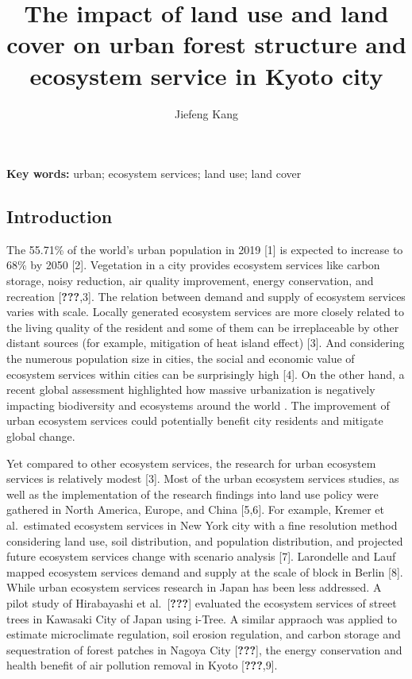 \documentclass[
]{article}
\title{The impact of land use and land cover on urban forest structure and ecosystem service in Kyoto city}
\author{Jiefeng Kang}
\date{}
\begin{document}
\maketitle

{
\setcounter{tocdepth}{2}
\tableofcontents
}
\textbf{Key words: }
urban; ecosystem services; land use; land cover

\hypertarget{introduction}{%
\subsection{Introduction}\label{introduction}}

The 55.71\% of the world's urban population in 2019 {[}1{]} is expected to increase to 68\% by 2050 {[}2{]}.
Vegetation in a city provides ecosystem services like carbon storage, noisy reduction, air quality improvement, energy conservation, and recreation {[}{\textbf{???}},3{]}.
The relation between demand and supply of ecosystem services varies with scale. Locally generated ecosystem services are more closely related to the living quality of the resident and some of them can be irreplaceable by other distant sources (for example, mitigation of heat island effect) {[}3{]}.
And considering the numerous population size in cities, the social and economic value of ecosystem services within cities can be surprisingly high {[}4{]}.
On the other hand, a recent global assessment highlighted how massive urbanization is negatively impacting biodiversity and ecosystems around the world .
The improvement of urban ecosystem services could potentially benefit city residents and mitigate global change.

Yet compared to other ecosystem services, the research for urban ecosystem services is relatively modest {[}3{]}.
Most of the urban ecosystem services studies, as well as the implementation of the research findings into land use policy were gathered in North America, Europe, and China {[}5,6{]}.
For example, Kremer et al.~estimated ecosystem services in New York city with a fine resolution method considering land use, soil distribution, and population distribution, and projected future ecosystem services change with scenario analysis {[}7{]}.
Larondelle and Lauf mapped ecosystem services demand and supply at the scale of block in Berlin {[}8{]}.
While urban ecosystem services research in Japan has been less addressed.
A pilot study of Hirabayashi et al.~{[}{\textbf{???}}{]} evaluated the ecosystem services of street trees in Kawasaki City of Japan using i-Tree. A similar appraoch was applied to estimate microclimate regulation, soil erosion regulation, and carbon storage and sequestration of forest patches in Nagoya City {[}{\textbf{???}}{]}, the energy conservation and health benefit of air pollution removal in Kyoto {[}{\textbf{???}},9{]}.
\end{document}
